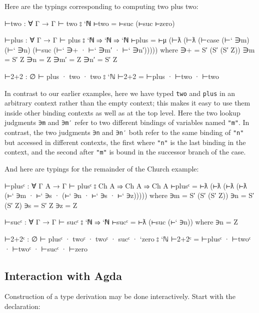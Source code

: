 Here are the typings corresponding to computing two plus two:

\begin{fence}
\begin{code}
⊢two : ∀ {Γ} → Γ ⊢ two ⦂ `ℕ
⊢two = ⊢suc (⊢suc ⊢zero)

⊢plus : ∀ {Γ} → Γ ⊢ plus ⦂ `ℕ ⇒ `ℕ ⇒ `ℕ
⊢plus = ⊢μ (⊢ƛ (⊢ƛ (⊢case (⊢` ∋m) (⊢` ∋n)
         (⊢suc (⊢` ∋+ · ⊢` ∋m′ · ⊢` ∋n′)))))
  where
  ∋+  = S′ (S′ (S′ Z))
  ∋m  = S′ Z
  ∋n  = Z
  ∋m′ = Z
  ∋n′ = S′ Z

⊢2+2 : ∅ ⊢ plus · two · two ⦂ `ℕ
⊢2+2 = ⊢plus · ⊢two · ⊢two
\end{code}
\end{fence}

In contrast to our earlier examples, here we have typed \texttt{two} and
\texttt{plus} in an arbitrary context rather than the empty context;
this makes it easy to use them inside other binding contexts as well as
at the top level. Here the two lookup judgments \texttt{∋m} and
\texttt{∋m′} refer to two different bindings of variables named
\texttt{"m"}. In contrast, the two judgments \texttt{∋n} and
\texttt{∋n′} both refer to the same binding of \texttt{"n"} but accessed
in different contexts, the first where \texttt{"n"} is the last binding
in the context, and the second after \texttt{"m"} is bound in the
successor branch of the case.

And here are typings for the remainder of the Church example:

\begin{fence}
\begin{code}
⊢plusᶜ : ∀ {Γ A} → Γ  ⊢ plusᶜ ⦂ Ch A ⇒ Ch A ⇒ Ch A
⊢plusᶜ = ⊢ƛ (⊢ƛ (⊢ƛ (⊢ƛ (⊢` ∋m · ⊢` ∋s · (⊢` ∋n · ⊢` ∋s · ⊢` ∋z)))))
  where
  ∋m = S′ (S′ (S′ Z))
  ∋n = S′ (S′ Z)
  ∋s = S′ Z
  ∋z = Z

⊢sucᶜ : ∀ {Γ} → Γ ⊢ sucᶜ ⦂ `ℕ ⇒ `ℕ
⊢sucᶜ = ⊢ƛ (⊢suc (⊢` ∋n))
  where
  ∋n = Z

⊢2+2ᶜ : ∅ ⊢ plusᶜ · twoᶜ · twoᶜ · sucᶜ · `zero ⦂ `ℕ
⊢2+2ᶜ = ⊢plusᶜ · ⊢twoᶜ · ⊢twoᶜ · ⊢sucᶜ · ⊢zero
\end{code}
\end{fence}

\hypertarget{interaction-with-agda}{%
\subsection{Interaction with Agda}\label{interaction-with-agda}}

Construction of a type derivation may be done interactively. Start with
the declaration:

